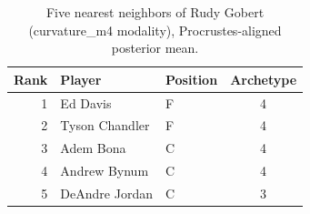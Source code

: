 \begin{table}[htbp]
  \centering\small
  \begin{tabular}{rllc}
    \toprule
    Rank & Player & Position & Archetype \\
    \midrule
    1 & Ed Davis & F & 4 \\
    2 & Tyson Chandler & F & 4 \\
    3 & Adem Bona & C & 4 \\
    4 & Andrew Bynum & C & 4 \\
    5 & DeAndre Jordan & C & 3 \\
    \bottomrule
  \end{tabular}
  \caption{Five nearest neighbors of Rudy Gobert (curvature_m4 modality), Procrustes-aligned posterior mean.}
  \label{tab:Rudy_Gobert_neighbors_curvature_m4}
\end{table}

